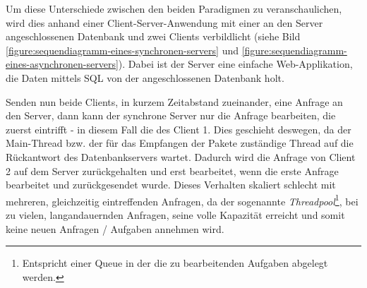 \begin{table}[h]
    \caption{Vergleich zwischen synchroner und asynchroner Ausführung}
    \label{tab:vergleich-synchroner-asynchroner-Ausfuehrung}
\end{table}

Um diese Unterschiede zwischen den beiden Paradigmen zu veranschaulichen, wird dies anhand einer Client-Server-Anwendung mit einer an den Server angeschlossenen Datenbank und zwei Clients verbildlicht (siehe Bild \ref{figure:sequendiagramm-eines-synchronen-servers} und \ref{figure:sequendiagramm-eines-asynchronen-servers}). Dabei ist der Server eine einfache Web-Applikation, die Daten mittels SQL von der angeschlossenen Datenbank holt.

Senden nun beide Clients, in kurzem Zeitabstand zueinander, eine Anfrage an den Server, dann kann der synchrone Server nur die Anfrage bearbeiten, die zuerst eintrifft - in diesem Fall die des Client 1. Dies geschieht deswegen, da der Main-Thread bzw. der für das Empfangen der Pakete zuständige Thread auf die Rückantwort des Datenbankservers wartet. Dadurch wird die Anfrage von Client 2 auf dem Server zurückgehalten und erst bearbeitet, wenn die erste Anfrage bearbeitet und zurückgesendet wurde. Dieses Verhalten skaliert schlecht mit mehreren, gleichzeitig eintreffenden Anfragen, da der sogenannte \textit{Threadpool}\footnote{Entspricht einer Queue in der die zu bearbeitenden Aufgaben abgelegt werden.}, bei zu vielen, langandauernden Anfragen, seine volle Kapazität erreicht und somit keine neuen Anfragen / Aufgaben annehmen wird.

